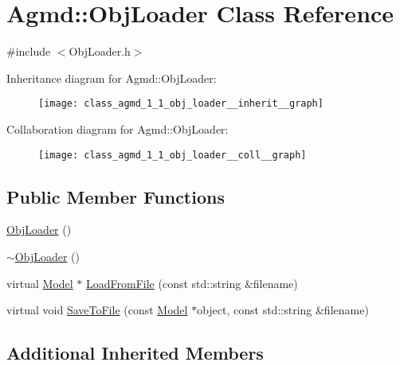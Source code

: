 \hypertarget{class_agmd_1_1_obj_loader}{\section{Agmd\+:\+:Obj\+Loader Class Reference}
\label{class_agmd_1_1_obj_loader}
}


{\ttfamily \#include $<$Obj\+Loader.\+h$>$}



Inheritance diagram for Agmd\+:\+:Obj\+Loader\+:\nopagebreak
\begin{figure}[H]
\begin{center}
\leavevmode
\texttt{[image: class\_agmd\_1\_1\_obj\_loader\_\_inherit\_\_graph]}
\end{center}
\end{figure}


Collaboration diagram for Agmd\+:\+:Obj\+Loader\+:\nopagebreak
\begin{figure}[H]
\begin{center}
\leavevmode
\texttt{[image: class\_agmd\_1\_1\_obj\_loader\_\_coll\_\_graph]}
\end{center}
\end{figure}
\subsection*{Public Member Functions}
\begin{DoxyCompactItemize}
\item 
\hyperlink{class_agmd_1_1_obj_loader_a13f50dd3ad123f69f6c7f74ceb02e3ec}{Obj\+Loader} ()
\item 
\hyperlink{class_agmd_1_1_obj_loader_ad0a2eae80661ec79713ca1a5d9208f1c}{$\sim$\+Obj\+Loader} ()
\item 
virtual \hyperlink{class_agmd_1_1_model}{Model} $\ast$ \hyperlink{class_agmd_1_1_obj_loader_a2834d6c2ff1020a6154baf54eff330f2}{Load\+From\+File} (const std\+::string \&filename)
\item 
virtual void \hyperlink{class_agmd_1_1_obj_loader_a011e55fd1ad12a4e42d9e6ee845ef034}{Save\+To\+File} (const \hyperlink{class_agmd_1_1_model}{Model} $\ast$object, const std\+::string \&filename)
\end{DoxyCompactItemize}
\subsection*{Additional Inherited Members}


